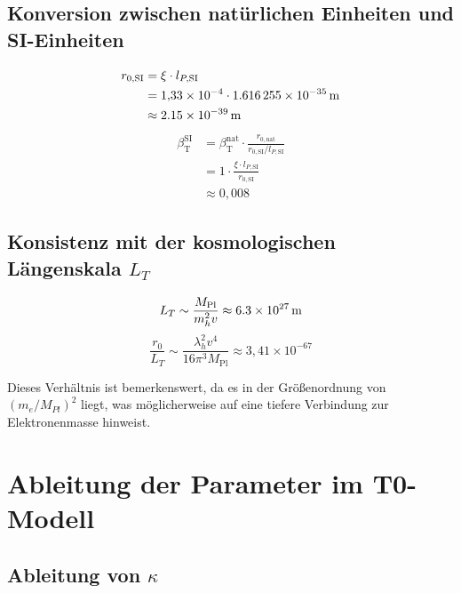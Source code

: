 \documentclass[12pt,a4paper]{article}
\newcommand{\Mpl}{M_{\text{Pl}}}
\newcommand{\betaT}{\beta_{\text{T}}}
\begin{document}
	\subsection{Konversion zwischen natürlichen Einheiten und SI-Einheiten}
	
	\begin{align}
		r_{0,\text{SI}} &= \xi \cdot l_{P,\text{SI}} \\
		&= 1{,}33 \times 10^{-4} \cdot \SI{1{,}616255e-35}{\meter} \\
		&\approx \SI{2{,}15e-39}{\meter}
	\end{align}
	\begin{align}
		\betaT^{\text{SI}} &= \betaT^{\text{nat}} \cdot \frac{r_{0,\text{nat}}}{r_{0,\text{SI}}/l_{P,\text{SI}}} \\
		&= 1 \cdot \frac{\xi \cdot l_{P,\text{SI}}}{r_{0,\text{SI}}} \\
		&\approx 0{,}008
	\end{align}
	
	\subsection{Konsistenz mit der kosmologischen Längenskala \(L_T\)}
	
	\begin{equation}
		L_T \sim \frac{\Mpl}{m_h^2 v} \approx \SI{6{,}3e27}{\meter}
	\end{equation}
	\begin{equation}
		\frac{r_0}{L_T} \sim \frac{\lambda_h^2 v^4}{16\pi^3 \Mpl} \approx 3{,}41 \times 10^{-67}
	\end{equation}
	
	Dieses Verhältnis ist bemerkenswert, da es in der Größenordnung von \((m_e/M_{Pl})^2\) liegt, was möglicherweise auf eine tiefere Verbindung zur Elektronenmasse hinweist.
	
	
	\section{Ableitung der Parameter im T0-Modell}
	
	\subsection{Ableitung von \(\kappa\)}
	
\end{document}
